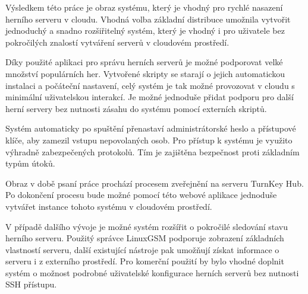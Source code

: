 \begin{conclusion}
    Výsledkem této práce je obraz systému, který je vhodný pro rychlé nasazení herního serveru v cloudu.
    Vhodná volba základní distribuce umožnila vytvořit jednoduchý a snadno rozšiřitelný systém,
    který je vhodný i pro uživatele bez pokročilých znalostí vytváření serverů v cloudovém prostředí.

    Díky použité aplikaci pro správu herních serverů je možné podporovat velké množství populárních her.
    Vytvořené skripty se starají o jejich automatickou instalaci a počáteční nastavení, celý systém je tak
    možné provozovat v cloudu s minimální uživatelskou interakcí. Je možné jednoduše přidat podporu pro
    další herní servery bez nutnosti zásahu do systému pomocí externích skriptů.

    Systém automaticky po spuštění přenastaví administrátorské heslo a přístupové klíče, aby zamezil vstupu
    nepovolaných osob. Pro přístup k systému je využito výhradně zabezpečených protokolů.
    Tím je zajištěna bezpečnost proti základním typům útoků.

    Obraz v době psaní práce prochází procesem zveřejnění na serveru \mbox{TurnKey} Hub. Po dokončení procesu
    bude možné pomocí této webové aplikace jednoduše vytvářet instance tohoto systému v cloudovém prostředí.

    V případě dalšího vývoje je možné systém rozšířit o pokročilé sledování stavu herního serveru. Použitý správce LinuxGSM podporuje
    zobrazení základních vlastností serveru, další existující nástroje pak umožňují získat informace o serveru i z externího
    prostředí. Pro komerční použití by bylo vhodné doplnit systém o možnost podrobné uživatelské konfigurace herních serverů bez nutnosti SSH přístupu.
\end{conclusion}